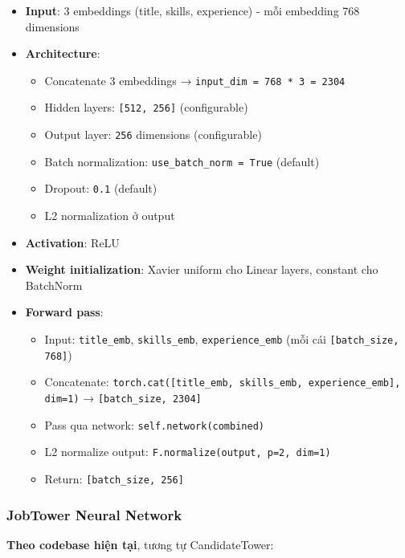 \begin{itemize}
    \item \textbf{Input}: 3 embeddings (title, skills, experience) - mỗi embedding 768 dimensions
    \item \textbf{Architecture}:
    \begin{itemize}
        \item Concatenate 3 embeddings → \texttt{input\_dim = 768 * 3 = 2304}
        \item Hidden layers: \texttt{[512, 256]} (configurable)
        \item Output layer: \texttt{256} dimensions (configurable)
        \item Batch normalization: \texttt{use\_batch\_norm = True} (default)
        \item Dropout: \texttt{0.1} (default)
        \item L2 normalization ở output
    \end{itemize}
    \item \textbf{Activation}: ReLU
    \item \textbf{Weight initialization}: Xavier uniform cho Linear layers, constant cho BatchNorm
    \item \textbf{Forward pass}:
    \begin{itemize}
        \item Input: \texttt{title\_emb}, \texttt{skills\_emb}, \texttt{experience\_emb} (mỗi cái \texttt{[batch\_size, 768]})
        \item Concatenate: \texttt{torch.cat([title\_emb, skills\_emb, experience\_emb], dim=1)} → \texttt{[batch\_size, 2304]}
        \item Pass qua network: \texttt{self.network(combined)}
        \item L2 normalize output: \texttt{F.normalize(output, p=2, dim=1)}
        \item Return: \texttt{[batch\_size, 256]}
    \end{itemize}
\end{itemize}

\subsubsection{JobTower Neural Network}

\textbf{Theo codebase hiện tại}, tương tự CandidateTower:

